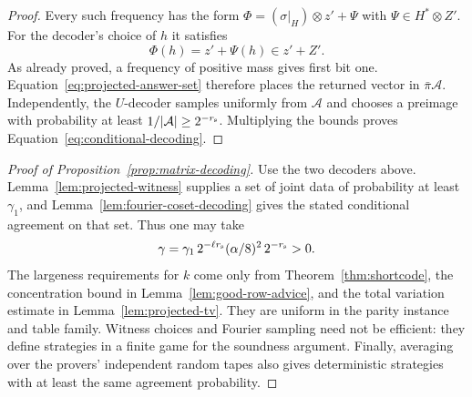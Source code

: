 \begin{proof}
Every such frequency has the form
$\Phi=(\sigma|_H)\otimes z'+\Psi$ with $\Psi\in H^*\otimes Z'$.
For the decoder's choice of $h$ it satisfies
\[
 \Phi(h)=z'+\Psi(h)\in z'+Z'.
\]
As already proved, a frequency of positive mass gives first bit one.
Equation~\eqref{eq:projected-answer-set} therefore places the returned
vector in $\bar\pi\mathcal A$.  Independently, the $U$-decoder samples
uniformly from $\mathcal A$ and chooses a preimage with probability at
least $1/|\mathcal A|\ge2^{-r_{\rm s}}$.  Multiplying the bounds proves
Equation~\eqref{eq:conditional-decoding}.
\end{proof}

\begin{proof}[Proof of Proposition~\ref{prop:matrix-decoding}]
Use the two decoders above.  Lemma~\ref{lem:projected-witness} supplies a
set of joint data of probability at least $\gamma_1$, and
Lemma~\ref{lem:fourier-coset-decoding} gives the stated conditional
agreement on that set.  Thus one may take
\[
 \gamma=\gamma_1\,2^{-\ell r_{\rm s}}(\alpha/8)^2\,2^{-r_{\rm s}}>0.
\]
The largeness requirements for $k$ come only from
Theorem~\ref{thm:shortcode}, the concentration bound in
Lemma~\ref{lem:good-row-advice}, and the total variation estimate in
Lemma~\ref{lem:projected-tv}.  They are uniform in the parity instance
and table family.  Witness choices and Fourier sampling need not be efficient:
they define strategies in a finite game for the soundness argument.
Finally, averaging over the provers' independent random tapes also gives
deterministic strategies with at least the same agreement probability.
\end{proof}
